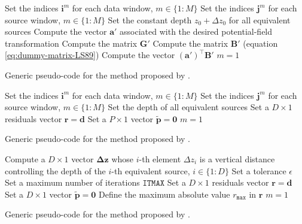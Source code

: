\begin{algorithm}
	\Input{}
	Set the indices $\mathbf{i}^{m}$ for each data window, $m \in \{ 1 : M \}$ \;
	Set the indices $\mathbf{j}^{m}$ for each source window, $m \in \{ 1 : M \}$ \;
	Set the constant depth $z_{0} + \Delta z_{0}$ for all equivalent sources \;
	Compute the vector $\mathbf{a}'$ associated with the desired potential-field transformation \;
	Compute the matrix $\mathbf{G}'$ \;
	Compute the matrix $\mathbf{B}'$ (equation \ref{eq:dummy-matrix-LS89}) \;
	Compute the vector $\left( \mathbf{a}' \right)^{\top} \mathbf{B}'$ \;
	$m = 1$ \;
	\caption{Generic pseudo-code for the method proposed by \cite{leao-silva1989}.}
	\label{alg:LS89}
\end{algorithm}

\begin{algorithm}
	\Input{}
	Set the indices $\mathbf{i}^{m}$ for each data window, $m \in \{ 1 : M \}$ \;
	Set the indices $\mathbf{j}^{m}$ for each source window, $m \in \{ 1 : M \}$ \;
	Set the depth of all equivalent sources \;
	Set a $D \times 1$ residuals vector $\mathbf{r} = \mathbf{d}$ \;
	Set a $P \times 1$ vector $\tilde{\mathbf{p}} = \mathbf{0}$ \;
	$m = 1$ \;
	\caption{Generic pseudo-code for the method proposed by \cite{soler-uieda2021}.}
	\label{alg:SU21}
\end{algorithm}

\begin{algorithm}
	\Input{}
	Compute a $D \times 1$ vector $\boldsymbol{\Delta}\mathbf{z}$ whose $i$-th element $\Delta z_{i}$ 
	is a vertical distance controlling the depth of the $i$-th equivalent source, $i \in \{1:D\}$ \;
	Set a tolerance $\epsilon$ \;
	Set a maximum number of iterations $\mathtt{ITMAX}$ \;
	Set a $D \times 1$ residuals vector $\mathbf{r} = \mathbf{d}$ \;
	Set a $D \times 1$ vector $\tilde{\mathbf{p}} = \mathbf{0}$ \;
	Define the maximum absolute value $r_{\mathtt{max}}$ in $\mathbf{r}$ \;
	$m = 1$ \;
	\caption{Generic pseudo-code for the method proposed by \cite{cordell1992}.}
	\label{alg:C92}
\end{algorithm}

